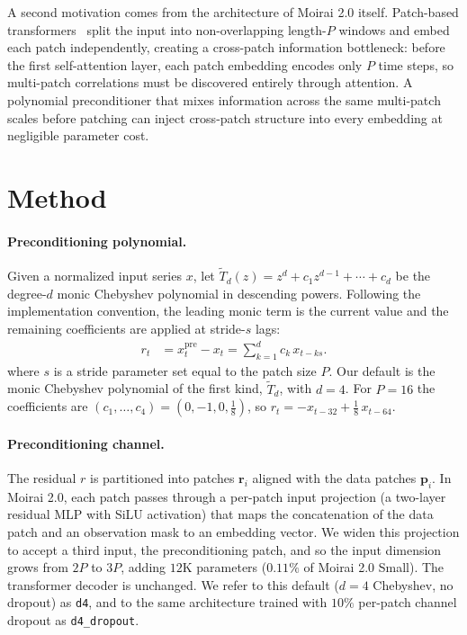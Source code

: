 \documentclass{article}
\begin{document}
A second motivation comes from the architecture of Moirai 2.0 itself. Patch-based transformers~\citep{nie2023patchtst,dosovitskiy2021image} split the input into non-overlapping length-$P$ windows and embed each patch independently, creating a cross-patch information bottleneck: before the first self-attention layer, each patch embedding encodes only $P$ time steps, so multi-patch correlations must be discovered entirely through attention. A polynomial preconditioner that mixes information across the same multi-patch scales before patching can inject cross-patch structure into every embedding at negligible parameter cost.

\section{Method}
\paragraph{Preconditioning polynomial.} Given a normalized input series $x$, let $\tilde T_d(z)=z^d+c_1 z^{d-1}+\cdots+c_d$ be the degree-$d$ monic Chebyshev polynomial in descending powers. Following the implementation convention, the leading monic term is the current value and the remaining coefficients are applied at stride-$s$ lags:
\begin{equation}
\begin{aligned}
r_t &= x_t^{\mathrm{pre}} - x_t
     = \sum_{k=1}^{d} c_k\,x_{t-ks}.
\end{aligned}
\label{eq:precond}
\end{equation}
where $s$ is a stride parameter set equal to the patch size $P$. Our default is the monic Chebyshev polynomial of the first kind, $\tilde T_d$, with $d=4$. For $P=16$ the coefficients are $(c_1,\dots,c_4) = (0,-1,0,\tfrac{1}{8})$, so $r_t = -x_{t-32} + \tfrac{1}{8}\, x_{t-64}$.

\paragraph{Preconditioning channel.} The residual $r$ is partitioned into patches $\mathbf{r}_i$ aligned with the data patches $\mathbf{p}_i$. In Moirai 2.0, each patch passes through a per-patch input projection (a two-layer residual MLP with SiLU activation) that maps the concatenation of the data patch and an observation mask to an embedding vector. We widen this projection to accept a third input, the preconditioning patch, and so the input dimension grows from $2P$ to $3P$, adding $12$K parameters ($0.11\%$ of Moirai 2.0 Small). The transformer decoder is unchanged. We refer to this default ($d=4$ Chebyshev, no dropout) as \texttt{d4}, and to the same architecture trained with $10\%$ per-patch channel dropout as \texttt{d4\_dropout}.
\end{document}
